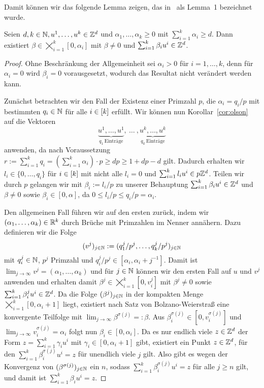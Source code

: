 Damit können wir das folgende Lemma zeigen, das in~\cite{Paat2018} als Lemma~1 bezeichnet wurde.

\begin{lemma}\label{lem:olson}
	Seien $d,k\in\mathbb{N}, u^1,\dots, u^k\in\mathbb{Z}^d$ und $\alpha_1,\dots,\alpha_k\geq0$ mit $\sum_{i=1}^k \alpha_i\geq d$.
	Dann existiert $\beta\in\bigtimes_{i=1}^k[0,\alpha_i]$ mit $\beta\neq0$ und $\sum_{i=1}^k\beta_i u^i \in\mathbb{Z}^d$.
\end{lemma}
\begin{proof}
	\newcommand{\bbeta}{\tilde{\beta}}
	Ohne Beschränkung der Allgemeinheit sei $\alpha_i>0$ für $i=1,\dots,k$, denn für $\alpha_i=0$ wird $\beta_i=0$ vorausgesetzt, wodurch das Resultat nicht verändert werden kann.
	
	Zunächst betrachten wir den Fall der Existenz einer Primzahl $p$, die $\alpha_i=q_i / p$ mit bestimmten $q_i\in\mathbb{N}$ für alle $i\in[k]$ erfüllt.
	Wir können nun Korollar~\ref{cor:olson} auf die Vektoren
	$$\underbrace{u^1,\dots,u^1}_{q_1~\text{Einträge}},~\dots~,\underbrace{u^k,\dots,u^k}_{q_k~\text{Einträge}}$$
	anwenden, da nach Voraussetzung $r:=\sum_{i=1}^k q_i=(\sum_{i=1}^k \alpha_i)\cdot p\geq dp \geq 1+dp-d$ gilt.
	Dadurch erhalten wir $l_i\in\{0,\dots,q_i\}$ für $i\in[k]$ mit nicht alle $l_i=0$ und $\sum_{i=1}^k l_i u^i\in p\mathbb{Z}^d$.
	Teilen wir durch $p$ gelangen wir mit $\beta_i := l_i/p$ zu unserer Behauptung $\sum_{i=1}^k \beta_i u^i\in\mathbb{Z}^d$ und $\beta\neq0$ sowie $\beta_i\in[0,\alpha]$, da $0\leq l_i/p\leq q_i/p=\alpha_i$.
	
	Den allgemeinen Fall führen wir auf den ersten zurück, indem wir $(\alpha_1,\dots,\alpha_k)\in\mathbb{R}^k$ durch Brüche mit Primzahlen im Nenner annähern.
	Dazu definieren wir die Folge 
	$$
	(v^j)_{j\in\mathbb{N}}:=(q^j_1/p^j,\dots,q^j_k/p^j)_{j\in\mathbb{N}}$$
	mit $q^j_i\in\mathbb{N}$, $p^j$ Primzahl und $q^j_i/p^j\in[\alpha_i, \alpha_i+j^{-1}]$.
	Damit ist $\lim_{j\rightarrow\infty}v^j=(\alpha_1,\dots,\alpha_k)$ und für $j\in\mathbb{N}$ können wir den ersten Fall auf $u$ und $v^j$ anwenden und erhalten damit $\beta^j\in\bigtimes_{i=1}^k[0,v^j_i]$ mit $\beta^j\neq0$ sowie $\sum_{i=1}^k\beta^j_i u^i \in\mathbb{Z}^d$.
	Da die Folge $(\beta^j)_{j\in\mathbb{N}}$ in der kompakten Menge $\bigtimes_{i=1}^k[0,\alpha_i+1]$ liegt, existiert nach Satz von Bolzano-Weierstraß eine konvergente Teilfolge mit $\lim_{j\to\infty} \beta^{\sigma(j)}=:\beta$.
	Aus $\beta^{\sigma(j)}_i\in[0,v^{\sigma(j)}_i]$ und $\lim_{j\to\infty}v^{\sigma(j)}_i=\alpha_i$ folgt nun $\beta_i\in[0,\alpha_i]$.
	Da es nur endlich viele $z\in\mathbb{Z}^d$ der Form $z=\sum_{i=1}^k\gamma_i u^i$ mit $\gamma_i\in[0,\alpha_i+1]$ gibt, existiert ein Punkt $z\in\mathbb{Z}^d$, für den $\sum_{i=1}^k \beta^{\sigma(j)}_i u^i=z$ für unendlich viele $j$ gilt.
	Also gibt es wegen der Konvergenz von $(\beta^{\sigma(j)})_{j\in\mathbb{N}}$ ein $n$, sodass $\sum_{i=1}^k\beta^{\sigma(j)}_i u^i=z$ für alle $j\geq n$ gilt, und damit ist $\sum_{i=1}^k\beta_i u^i=z$.
	

\end{proof}
